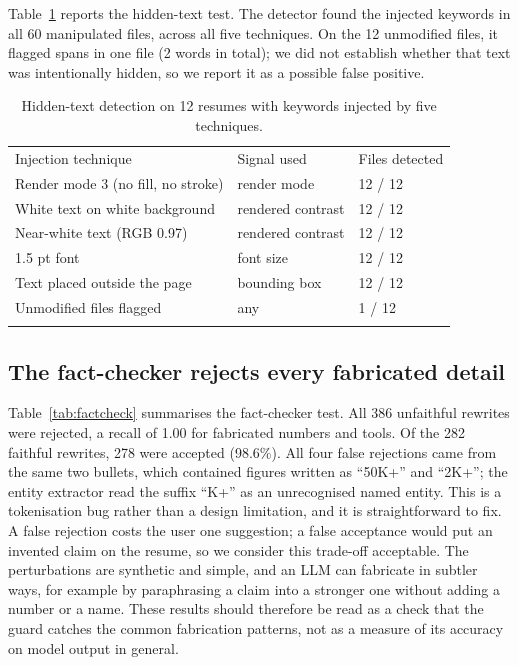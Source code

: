 \documentclass[3p,times,procedia]{elsarticle}
\begin{document}
Table~\ref{tab:stealth} reports the hidden-text test. The detector found the injected keywords in all 60 manipulated files, across all five techniques. On the 12 unmodified files, it flagged spans in one file (2 words in total); we did not establish whether that text was intentionally hidden, so we report it as a possible false positive.

\begin{table}[h]
\caption{Hidden-text detection on 12 resumes with keywords injected by five techniques.}
\label{tab:stealth}
\begin{tabular*}{\hsize}{@{\extracolsep{\fill}}lll@{}}
\toprule
Injection technique & Signal used & Files detected\\
\colrule
Render mode 3 (no fill, no stroke) & render mode & 12 / 12\\
White text on white background & rendered contrast & 12 / 12\\
Near-white text (RGB 0.97) & rendered contrast & 12 / 12\\
1.5 pt font & font size & 12 / 12\\
Text placed outside the page & bounding box & 12 / 12\\
\colrule
Unmodified files flagged & any & 1 / 12\\
\botrule
\end{tabular*}
\end{table}

\subsection{The fact-checker rejects every fabricated detail}
Table~\ref{tab:factcheck} summarises the fact-checker test. All 386 unfaithful rewrites were rejected, a recall of 1.00 for fabricated numbers and tools. Of the 282 faithful rewrites, 278 were accepted (98.6\%). All four false rejections came from the same two bullets, which contained figures written as ``50K+'' and ``2K+''; the entity extractor read the suffix ``K+'' as an unrecognised named entity. This is a tokenisation bug rather than a design limitation, and it is straightforward to fix. A false rejection costs the user one suggestion; a false acceptance would put an invented claim on the resume, so we consider this trade-off acceptable. The perturbations are synthetic and simple, and an LLM can fabricate in subtler ways, for example by paraphrasing a claim into a stronger one without adding a number or a name. These results should therefore be read as a check that the guard catches the common fabrication patterns, not as a measure of its accuracy on model output in general.
\end{document}
